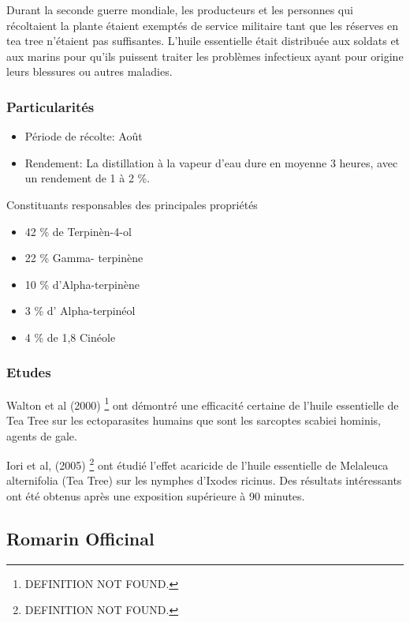 \documentclass[12pt,a4wide]{article}
\begin{document}
Durant la seconde guerre mondiale, les producteurs et les personnes qui récoltaient la plante étaient exemptés de service militaire tant que les réserves en tea tree n'étaient pas suffisantes. L'huile essentielle était distribuée aux soldats et aux marins pour qu'ils puissent traiter les problèmes infectieux ayant pour origine leurs blessures ou autres maladies.

\subsubsection{Particularités}
\label{sec-4-8-4}
\begin{itemize}
\item Période de récolte: Août
\item Rendement: La distillation à la vapeur d'eau dure en moyenne 3 heures, avec un rendement de 1 à 2 \%.
\end{itemize}


Constituants responsables des principales propriétés
\begin{itemize}
\item 42 \% de Terpinèn-4-ol
\item 22 \% Gamma- terpinène
\item 10 \% d'Alpha-terpinène
\item 3 \% d' Alpha-terpinéol
\item 4 \% de 1,8 Cinéole
\end{itemize}

\subsubsection{Etudes}
\label{sec-4-8-5}

Walton et al (2000) \footnote{DEFINITION NOT FOUND.} ont démontré une efficacité certaine de l'huile essentielle de Tea Tree sur les ectoparasites humains que sont les sarcoptes scabiei hominis, agents de gale.

Iori et al, (2005) \footnote{DEFINITION NOT FOUND.} ont étudié l'effet acaricide de l'huile essentielle de Melaleuca alternifolia (Tea Tree) sur les nymphes d'Ixodes ricinus. Des résultats intéressants ont été obtenus après une exposition supérieure à 90 minutes. 



\subsection{Romarin Officinal}
\label{sec-4-9}
\end{document}
